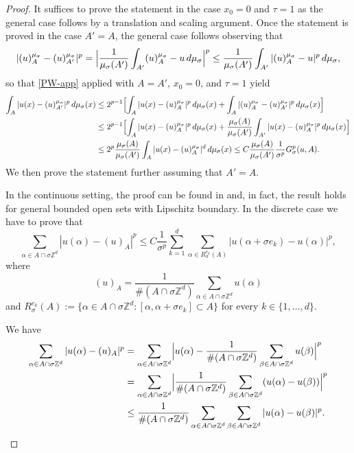 \documentclass{article}
\theoremstyle{plain}
\theoremstyle{definition}
\def\ZZ{{\mathbb Z}}
\newcommand{\s}{\sigma}
\numberwithin{equation}{section}
\begin{document}
\begin{proof}
    It suffices to prove the statement in the case $x_0=0$ and $\tau=1$ as the general case follows by a translation and scaling argument. Once the statement is proved in the case $A'=A$, the general case follows observing that
    \begin{equation*}
        |(u)_A^{\mu_\s}-(u)_{A'}^{\mu_\s}|^p=\Bigl|\frac{1}{\mu_\s(A')}\int_{A'}(u)_A^{\mu_\s}-u\, d\mu_\s\Bigr|^p
        \leq \frac{1}{\mu_\s(A')}\int_{A'}|(u)_A^{\mu_\sigma}-u|^p\, d\mu_\sigma,
    \end{equation*}
    so that \eqref{PW-app} applied with $A=A'$, $x_0=0$, and $\tau=1$ yield
    \begin{equation*}
        \begin{split}
            \int_A|u(x)-(u)_{A'}^{\mu_\sigma}|^p\, d\mu_\s(x)&\leq 2^{p-1}\Bigl[\int_A|u(x)-(u)_{A}^{\mu_\sigma}|^p\, d\mu_\s(x)+\int_A|(u)_A^{\mu_\sigma}-(u)_{A'}^{\mu_\sigma}|^p\, d\mu_\s(x)\Bigr] \\
            &\leq 2^{p-1}\Bigl[\int_A|u(x)-(u)_{A}^{\mu_\sigma}|^p\, d\mu_\s(x)+\frac{\mu_\s(A)}{\mu_\sigma(A')}\int_{A'}|u(x)-(u)_A^{\mu_\sigma}|^p\, d\mu_\sigma(x)
        \Bigr]\\
        &\leq 2^p\frac{\mu_\s(A)}{\mu_\sigma(A')}\int_{A}|u(x)-(u)_A^{\mu_\sigma}|^d\, d\mu_\sigma(x)\leq C\frac{\mu_\s(A)}{\mu_\sigma(A')}\frac{1}{\s^p}G^{p}_\s(u,A).
        \end{split}
    \end{equation*}
We then prove the statement further assuming that $A'=A$. 

In the continuous setting, the proof can be found in \cite[Proposition 4.2]{AABPT} and, in fact, the result holds for general bounded open sets with Lipschitz boundary. In the discrete case we have to prove that 
 \begin{equation*}
 \sum_{\alpha\in A\cap \s\ZZ^d}|u(\alpha)-(u)_A|^p \leq  C \frac{1}{\s^p}\sum_{k=1}^d \sum_{\alpha\in R_\s^{e_k}(A)}|u(\alpha+\s e_k)-u(\alpha)|^p,
    \end{equation*}
where
\begin{equation*}
    (u)_A=\frac{1}{\#(A\cap \s\ZZ^d)}\sum_{\alpha\in A\cap \s\ZZ^d} u(\alpha)
\end{equation*}
and $R_\s^{e_k}(A):=\{\alpha\in  A\cap\s\ZZ^d: [\alpha,\alpha+\s e_k]\subset A\}$ for every $k\in\{1,\dots, d\}$. 

We have
    \begin{align}\notag
       \sum_{\alpha\in  A\cap\s\ZZ^d}|u(\alpha)-(u)_A|^p & =  \sum_{\alpha\in A\cap\s\ZZ^d}\Bigl|u(\alpha)-\frac{1}{\# (A\cap\s\ZZ^d)}\sum_{\beta \in A\cap\s\ZZ^d}u(\beta)\Bigr|^p \\ \notag
       & = \sum_{\alpha\in A\cap\s\ZZ^d}\Bigl|\frac{1}{\# (A\cap\s\ZZ^d)}\sum_{\beta \in A\cap\s\ZZ^d}(u(\alpha)-u(\beta))\Bigr|^p \\ \label{poincare 1}
       & \leq \frac{1}{\# (A\cap\s\ZZ^d)}\sum_{\alpha\in A\cap\s\ZZ^d}\sum_{\beta \in A\cap\s\ZZ^d}|u(\alpha)-u(\beta)|^p.  
    \end{align}


\end{proof}
\end{document}
